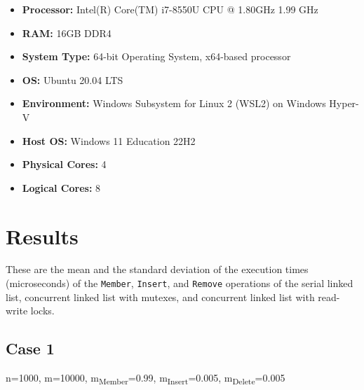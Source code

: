 \documentclass[a4paper,12pt]{article}
\begin{document}
\begin{itemize}
    \itemsep 0em
    \item \textbf{Processor:} Intel(R) Core(TM) i7-8550U CPU @ 1.80GHz   1.99 GHz
    \item \textbf{RAM:} 16GB DDR4
    \item \textbf{System Type:} 64-bit Operating System, x64-based processor
    \item \textbf{OS:} Ubuntu 20.04 LTS
    \item \textbf{Environment:} Windows Subsystem for Linux 2 (WSL2) on Windows Hyper-V
    \item \textbf{Host OS:} Windows 11 Education 22H2
    \item \textbf{Physical Cores:} 4
    \item \textbf{Logical Cores:} 8
\end{itemize}

\section{Results}

These are the mean and the standard deviation of the execution times (microseconds) of the
\lstinline|Member|, \lstinline|Insert|, and \lstinline|Remove| operations of
the serial linked list, concurrent linked list with mutexes, and concurrent
linked list with read-write locks.

\subsection{Case 1}

n=1000, m=10000, m\textsubscript{Member}=0.99, m\textsubscript{Insert}=0.005, m\textsubscript{Delete}=0.005
\end{document}
